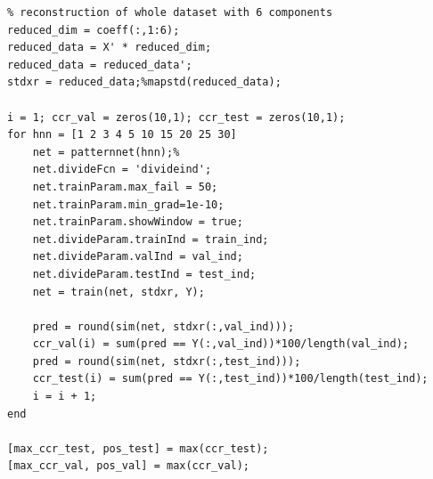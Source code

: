 \documentclass[11pt, a4paper]{article}
\begin{document}
\begin{appendices}
\begin{lstlisting}
% reconstruction of whole dataset with 6 components
reduced_dim = coeff(:,1:6);
reduced_data = X' * reduced_dim;
reduced_data = reduced_data';
stdxr = reduced_data;%mapstd(reduced_data);

i = 1; ccr_val = zeros(10,1); ccr_test = zeros(10,1);
for hnn = [1 2 3 4 5 10 15 20 25 30]
    net = patternnet(hnn);%
    net.divideFcn = 'divideind';
    net.trainParam.max_fail = 50;
    net.trainParam.min_grad=1e-10;
    net.trainParam.showWindow = true;
    net.divideParam.trainInd = train_ind;
    net.divideParam.valInd = val_ind;
    net.divideParam.testInd = test_ind;
    net = train(net, stdxr, Y);

    pred = round(sim(net, stdxr(:,val_ind)));
    ccr_val(i) = sum(pred == Y(:,val_ind))*100/length(val_ind);
    pred = round(sim(net, stdxr(:,test_ind)));
    ccr_test(i) = sum(pred == Y(:,test_ind))*100/length(test_ind);
    i = i + 1;
end

[max_ccr_test, pos_test] = max(ccr_test);
[max_ccr_val, pos_val] = max(ccr_val);
\end{lstlisting}
\end{appendices}
\end{document}
